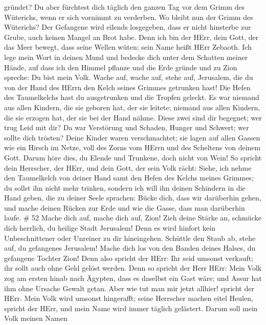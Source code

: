 gründet? Du aber fürchtest dich täglich den ganzen Tag vor dem Grimm des
Wüterichs, wenn er sich vornimmt zu verderben. Wo bleibt nun der Grimm
des Wüterichs?  Der Gefangene wird eilends losgegeben, dass
er nicht hinsterbe zur Grube, auch keinen Mangel an Brot habe.
 Denn ich bin der HErr, dein Gott, der das Meer bewegt,
dass seine Wellen wüten; sein Name heißt HErr Zebaoth.  Ich
lege mein Wort in deinen Mund und bedecke dich unter dem Schatten meiner
Hände, auf dass ich den Himmel pflanze und die Erde gründe und zu Zion
spreche: Du bist mein Volk.  Wache auf, wache auf, stehe
auf, Jerusalem, die du von der Hand des HErrn den Kelch seines Grimmes
getrunken hast! Die Hefen des Taumelkelchs hast du ausgetrunken und die
Tropfen geleckt.  Es war niemand aus allen Kindern, die sie
geboren hat, der sie leitete; niemand aus allen Kindern, die sie erzogen
hat, der sie bei der Hand nähme.  Diese zwei sind dir
begegnet; wer trug Leid mit dir? Da war Verstörung und Schaden, Hunger
und Schwert; wer sollte dich trösten?  Deine Kinder waren
verschmachtet; sie lagen auf allen Gassen wie ein Hirsch im Netze, voll
des Zorns vom HErrn und des Scheltens von deinem Gott. 
Darum höre dies, du Elende und Trunkene, doch nicht von Wein!
 So spricht dein Herrscher, der HErr, und dein Gott, der
sein Volk rächt: Siehe, ich nehme den Taumelkelch von deiner Hand samt
den Hefen des Kelchs meines Grimmes; du sollst ihn nicht mehr trinken,
 sondern ich will ihn deinen Schindern in die Hand geben,
die zu deiner Seele sprachen: Bücke dich, dass wir darüberhin gehen, und
mache deinen Rücken zur Erde und wie die Gasse, dass man darüberhin
laufe. \# 52  Mache dich auf, mache dich auf, Zion! Zieh
deine Stärke an, schmücke dich herrlich, du heilige Stadt Jerusalem!
Denn es wird hinfort kein Unbeschnittener oder Unreiner zu dir
hineingehen.  Schüttle den Staub ab, stehe auf, du
gefangenes Jerusalem! Mache dich los von den Banden deines Halses, du
gefangene Tochter Zion!  Denn also spricht der HErr: Ihr
seid umsonst verkauft; ihr sollt auch ohne Geld gelöst werden.
 Denn so spricht der Herr HErr: Mein Volk zog am ersten
hinab nach Ägypten, dass es daselbst ein Gast wäre; und Assur hat ihm
ohne Ursache Gewalt getan.  Aber wie tut man mir jetzt
allhier! spricht der HErr. Mein Volk wird umsonst hingerafft; seine
Herrscher machen eitel Heulen, spricht der HErr, und mein Name wird
immer täglich gelästert.  Darum soll mein Volk meinen Namen
